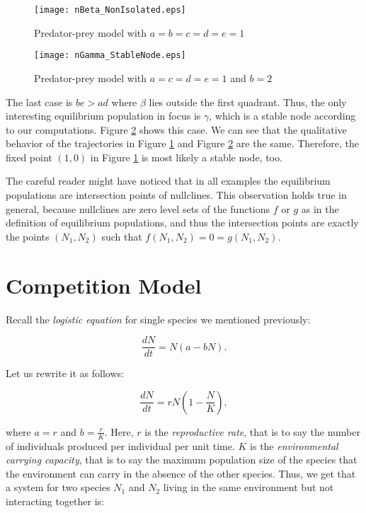 \documentclass[11pt,a4paper]{scrartcl}
\theoremstyle{definition}
\begin{document}
\begin{figure}[h]
	\centering
	\texttt{[image: nBeta\_NonIsolated.eps]}
	\caption{Predator-prey model with $a=b=c=d=e=1$}
	\label{fig5}
\end{figure}

\begin{figure}[h]
	\centering
	\texttt{[image: nGamma\_StableNode.eps]}
	\caption{Predator-prey model with $a=c=d=e=1$ and $b=2$}
	\label{fig6}
\end{figure}

The last case is $be>ad$ where $\beta$ lies outside the first quadrant. Thus, the only interesting equilibrium population in focus is $\gamma$, which is a stable node according to our computations. Figure \ref{fig6} shows this case. We can see that the qualitative behavior of the trajectories in Figure \ref{fig5} and Figure \ref{fig6} are the same. Therefore, the fixed point $(1,0)$ in Figure \ref{fig5} is most likely a stable node, too.
\newline

The careful reader might have noticed that in all examples the equilibrium populations are intersection points of nullclines. This observation holds true in general, because nullclines are zero level sets of the functions $f$ or $g$ as in the definition of equilibrium populations, and thus the intersection points are exactly the points $(N_1,N_2)$ such that $f(N_1,N_2)=0=g(N_1,N_2)$.

\FloatBarrier

\section{Competition Model}

Recall the \textit{logistic equation} for single species we mentioned previously:

\begin{equation} \tag{3}
	\frac{dN}{dt}=N(a-bN). 
\end{equation}

Let us rewrite it as follows:

\begin{equation} \label{eq9}
	\frac{dN}{dt}=rN(1-\frac{N}{K}), 
\end{equation}

where $a=r$ and $b=\frac{r}{K}$. Here, $r$ is the \textit{reproductive rate}, that is to say the number of individuals produced per individual per unit time. $K$ is the \textit{environmental carrying capacity}, that is to say the maximum population size of the species that the environment can carry in the absence of the other species\cite{Murray}. Thus, we get that a system for two species $N_1$ and $N_2$ living in the same environment but not interacting together is:
\end{document}

